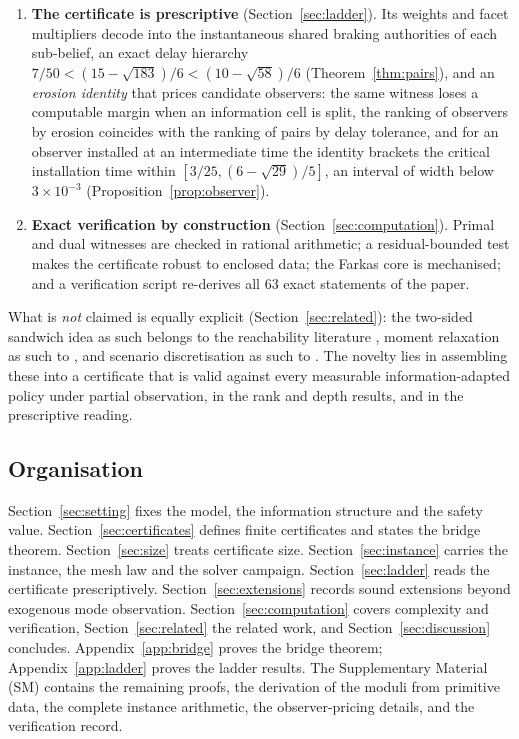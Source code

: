 \documentclass[11pt,a4paper]{article}
\theoremstyle{plain}
\theoremstyle{definition}
\theoremstyle{remark}
\begin{document}
\begin{enumerate}[leftmargin=1.6em,itemsep=2pt]
\item \textbf{The certificate is prescriptive} (Section~\ref{sec:ladder}). Its weights and facet multipliers decode into the instantaneous shared braking authorities of each sub-belief, an exact delay hierarchy $7/50<(15-\sqrt{183})/6<(10-\sqrt{58})/6$ (Theorem~\ref{thm:pairs}), and an \emph{erosion identity} that prices candidate observers: the same witness loses a computable margin when an information cell is split, the ranking of observers by erosion coincides with the ranking of pairs by delay tolerance, and for an observer installed at an intermediate time the identity brackets the critical installation time within $[3/25,(6-\sqrt{29})/5]$, an interval of width below $3\times10^{-3}$ (Proposition~\ref{prop:observer}).
\item \textbf{Exact verification by construction} (Section~\ref{sec:computation}). Primal and dual witnesses are checked in rational arithmetic; a residual-bounded test makes the certificate robust to enclosed data; the Farkas core is mechanised; and a verification script re-derives all 63 exact statements of the paper.
\end{enumerate}

What is \emph{not} claimed is equally explicit (Section~\ref{sec:related}): the two-sided sandwich idea as such belongs to the reachability literature \cite{Maidens2013}, moment relaxation as such to \cite{Lasserre2001,Parrilo2003,Lasserre2008}, and scenario discretisation as such to \cite{CalafioreCampi2006,CampiGaratti2008}. The novelty lies in assembling these into a certificate that is valid against every measurable information-adapted policy under partial observation, in the rank and depth results, and in the prescriptive reading.

\subsection{Organisation}

Section~\ref{sec:setting} fixes the model, the information structure and the safety value. Section~\ref{sec:certificates} defines finite certificates and states the bridge theorem. Section~\ref{sec:size} treats certificate size. Section~\ref{sec:instance} carries the instance, the mesh law and the solver campaign. Section~\ref{sec:ladder} reads the certificate prescriptively. Section~\ref{sec:extensions} records sound extensions beyond exogenous mode observation. Section~\ref{sec:computation} covers complexity and verification, Section~\ref{sec:related} the related work, and Section~\ref{sec:discussion} concludes. Appendix~\ref{app:bridge} proves the bridge theorem; Appendix~\ref{app:ladder} proves the ladder results. The Supplementary Material (SM) contains the remaining proofs, the derivation of the moduli from primitive data, the complete instance arithmetic, the observer-pricing details, and the verification record.
\end{document}
